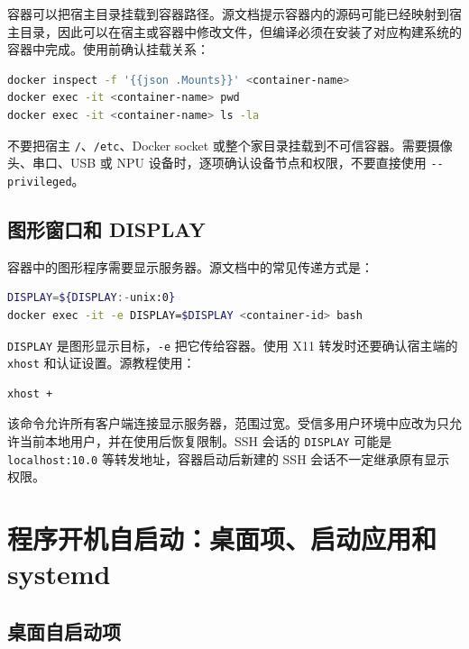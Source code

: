 容器可以把宿主目录挂载到容器路径。源文档提示容器内的源码可能已经映射到宿主目录，因此可以在宿主或容器中修改文件，但编译必须在安装了对应构建系统的容器中完成。使用前确认挂载关系：

\begin{lstlisting}[language=bash]
docker inspect -f '{{json .Mounts}}' <container-name>
docker exec -it <container-name> pwd
docker exec -it <container-name> ls -la
\end{lstlisting}

不要把宿主
\passthrough{\lstinline!/!}、\passthrough{\lstinline!/etc!}、Docker
socket 或整个家目录挂载到不可信容器。需要摄像头、串口、USB 或 NPU
设备时，逐项确认设备节点和权限，不要直接使用
\passthrough{\lstinline!--privileged!}。

\subsection{图形窗口和
DISPLAY}\label{ux56feux5f62ux7a97ux53e3ux548c-display}

容器中的图形程序需要显示服务器。源文档中的常见传递方式是：

\begin{lstlisting}[language=bash]
DISPLAY=${DISPLAY:-unix:0}
docker exec -it -e DISPLAY=$DISPLAY <container-id> bash
\end{lstlisting}

\passthrough{\lstinline!DISPLAY!}
是图形显示目标，\passthrough{\lstinline!-e!} 把它传给容器。使用 X11
转发时还要确认宿主端的 \passthrough{\lstinline!xhost!}
和认证设置。源教程使用：

\begin{lstlisting}
xhost +
\end{lstlisting}

该命令允许所有客户端连接显示服务器，范围过宽。受信多用户环境中应改为只允许当前本地用户，并在使用后恢复限制。SSH
会话的 \passthrough{\lstinline!DISPLAY!} 可能是
\passthrough{\lstinline!localhost:10.0!} 等转发地址，容器启动后新建的
SSH 会话不一定继承原有显示权限。

\section{程序开机自启动：桌面项、启动应用和
systemd}\label{ux7a0bux5e8fux5f00ux673aux81eaux542fux52a8ux684cux9762ux9879ux542fux52a8ux5e94ux7528ux548c-systemd}

\subsection{桌面自启动项}\label{ux684cux9762ux81eaux542fux52a8ux9879}

